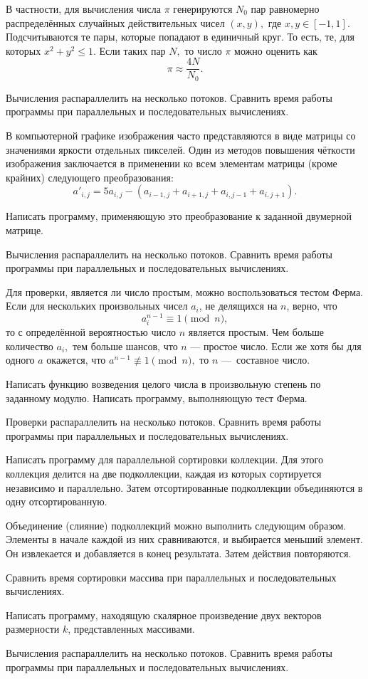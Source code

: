 В частности, для вычисления числа $\pi$ генерируются $N_0$ пар
равномерно распределённых случайных действительных чисел
$(x, y),$ где $x, y \in [-1, 1].$ Подсчитываются те пары, которые попадают в
единичный круг. То есть, те, для которых $x^2+y^2 \leqslant 1.$ Если
таких пар $N,$ то число $\pi$ можно оценить как
\[
\pi \approx \frac{4N}{N_0}.
\]

Вычисления распараллелить на несколько потоков. Сравнить время работы
программы при параллельных и последовательных вычислениях.

\task В компьютерной графике изображения часто представляются в виде
матрицы со значениями яркости отдельных пикселей. Один из методов
повышения чёткости изображения
заключается в применении ко всем элементам матрицы (кроме крайних)
следующего преобразования:
\[
a'_{i,j} = 5a_{i,j} - \left(
  a_{i-1, j} + a_{i+1, j} + a_{i, j-1} + a_{i, j+1}
\right).
\]

Написать программу, применяющую это преобразование к заданной
двумерной матрице.

Вычисления распараллелить на несколько потоков. Сравнить время работы
программы при параллельных и последовательных вычислениях.

\task Для проверки, является ли число простым, можно воспользоваться
тестом Ферма. Если для нескольких
произвольных чисел $a_i$, не делящихся на $n$, верно, что
\[
a_i^{n-1} \equiv 1 \pmod n,
\]
то с определённой вероятностью число $n$ является простым. Чем больше
количество $a_i,$ тем больше шансов, что $n$ — простое число. Если же
хотя бы для одного $a$ окажется, что $a^{n-1}\not\equiv1 \pmod n,$ то
$n$ — составное число.

Написать функцию возведения целого числа в произвольную степень по
заданному модулю. Написать программу, выполняющую тест Ферма.

Проверки распараллелить на несколько потоков. Сравнить время работы
программы при параллельных и последовательных вычислениях.

\task Написать программу для параллельной сортировки коллекции. Для
этого коллекция делится на две подколлекции, каждая из которых
сортируется независимо и параллельно. Затем отсортированные подколлекции
объединяются в одну отсортированную.

Объединение (слияние) подколлекций можно выполнить следующим
образом. Элементы в начале каждой из них сравниваются, и выбирается
меньший элемент. Он извлекается и добавляется в конец
результата. Затем действия повторяются.

Сравнить время сортировки массива при параллельных и последовательных
вычислениях.

\task Написать программу, находящую скалярное произведение двух
векторов размерности $k$, представленных массивами.

Вычисления распараллелить на несколько потоков. Сравнить время работы
программы при параллельных и последовательных вычислениях.


